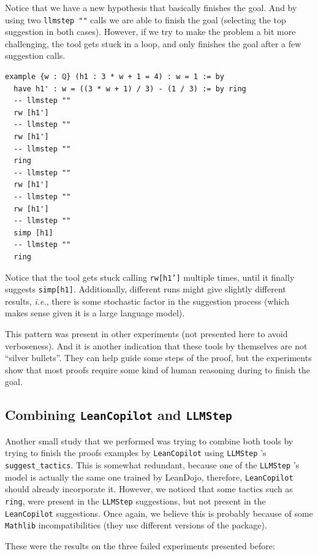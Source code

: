 \documentclass[12pt]{article}
\newcommand{\leancopilot}{\texttt{LeanCopilot} }
\newcommand{\llmstep}{\texttt{LLMStep} }
\begin{document}
Notice that we have a new hypothesis that basically finishes the goal. And by using two \texttt{llmstep ""} calls we are able to finish the goal (selecting the top suggestion in both cases). However, if we try to make the problem a bit more challenging, the tool gets stuck in a loop, and only finishes the goal after a few suggestion calls.

\begin{lstlisting}[title=\llmstep Proof]
example {w : ℚ} (h1 : 3 * w + 1 = 4) : w = 1 := by
  have h1' : w = ((3 * w + 1) / 3) - (1 / 3) := by ring
  -- llmstep ""
  rw [h1']
  -- llmstep ""
  rw [h1']
  -- llmstep ""
  ring
  -- llmstep ""
  rw [h1']
  -- llmstep ""
  rw [h1']
  -- llmstep ""
  simp [h1]
  -- llmstep ""
  ring
\end{lstlisting}

Notice that the tool gets stuck calling \texttt{rw[h1']} multiple times, until it finally suggests \texttt{simp[h1]}. Additionally, different runs might give slightly different results, \emph{i.e.}, there is some stochastic factor in the suggestion process (which makes sense given it is a large language model).

This pattern was present in other experiments (not presented here to avoid verboseness). And it is another indication that these tools by themselves are not ``silver bullets''. They can help guide some steps of the proof, but the experiments show that most proofs require some kind of human reasoning during to finish the goal.


\subsection{Combining \leancopilot and \llmstep} \label{subsec:combining}

Another small study that we performed was trying to combine both tools by trying to finish the proofs examples by \leancopilot using \llmstep's \texttt{suggest\_tactics}. This is somewhat redundant, because one of the \llmstep's model is actually the same one trained by LeanDojo, therefore, \leancopilot should already incorporate it. However, we noticed that some tactics such as \texttt{ring}, were present in the \llmstep suggestions, but not present in the \leancopilot suggestions. Once again, we believe this is probably because of some \texttt{Mathlib} incompatibilities (they use different versions of the package).

These were the results on the three failed experiments presented before:
\end{document}
